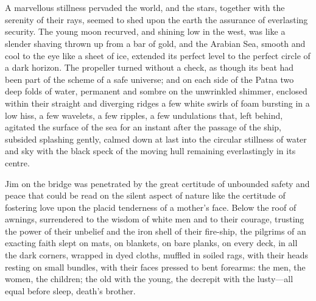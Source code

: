 \chapter{}
A marvellous stillness pervaded the world, and the stars, together with the serenity of their rays, seemed to shed upon the earth the assurance of everlasting security. The young moon recurved, and shining low in the west, was like a slender shaving thrown up from a bar of gold, and the Arabian Sea, smooth and cool to the eye like a sheet of ice, extended its perfect level to the perfect circle of a dark horizon. The propeller turned without a check, as though its beat had been part of the scheme of a safe universe; and on each side of the Patna two deep folds of water, permanent and sombre on the unwrinkled shimmer, enclosed within their straight and diverging ridges a few white swirls of foam bursting in a low hiss, a few wavelets, a few ripples, a few undulations that, left behind, agitated the surface of the sea for an instant after the passage of the ship, subsided splashing gently, calmed down at last into the circular stillness of water and sky with the black speck of the moving hull remaining everlastingly in its centre.

Jim on the bridge was penetrated by the great certitude of unbounded safety and peace that could be read on the silent aspect of nature like the certitude of fostering love upon the placid tenderness of a mother’s face. Below the roof of awnings, surrendered to the wisdom of white men and to their courage, trusting the power of their unbelief and the iron shell of their fire-ship, the pilgrims of an exacting faith slept on mats, on blankets, on bare planks, on every deck, in all the dark corners, wrapped in dyed cloths, muffled in soiled rags, with their heads resting on small bundles, with their faces pressed to bent forearms: the men, the women, the children; the old with the young, the decrepit with the lusty—all equal before sleep, death’s brother.


